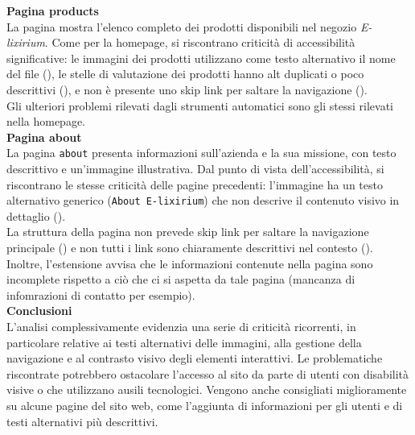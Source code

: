 \noindent \textbf{Pagina products}\\
La pagina mostra l’elenco completo dei prodotti disponibili nel negozio \textit{E-lixirium}. Come per la homepage, si riscontrano criticità di accessibilità significative: le immagini dei prodotti utilizzano come testo alternativo il nome del file ({}), le stelle di valutazione dei prodotti hanno alt duplicati o poco descrittivi ({}), e non è presente uno skip link per saltare la navigazione ({}).\\
Gli ulteriori problemi rilevati dagli strumenti automatici sono gli stessi rilevati nella homepage.\\

\noindent \textbf{Pagina about}\\
La pagina \texttt{about} presenta informazioni sull’azienda e la sua missione, con testo descrittivo e un’immagine illustrativa. Dal punto di vista dell’accessibilità, si riscontrano le stesse criticità delle pagine precedenti: l’immagine ha un testo alternativo generico (\texttt{About E-lixirium}) che non descrive il contenuto visivo in dettaglio ({}).\\
La struttura della pagina non prevede skip link per saltare la navigazione principale ({}) e non tutti i link sono chiaramente descrittivi nel contesto ({}). Inoltre, l'estensione avvisa che le informazioni contenute nella pagina sono incomplete rispetto a ciò che ci si aspetta da tale pagina (mancanza di infomrazioni di contatto per esempio).\\

\noindent \textbf{Conclusioni}\\
L’analisi complessivamente evidenzia una serie di criticità ricorrenti, in particolare relative ai testi alternativi delle immagini, alla gestione della navigazione e al contrasto visivo degli elementi interattivi. Le problematiche riscontrate potrebbero ostacolare l’accesso al sito da parte di utenti con disabilità visive o che utilizzano ausili tecnologici. Vengono anche consigliati miglioramente su alcune pagine del sito web, come l'aggiunta di informazioni per gli utenti e di testi alternativi più descrittivi.

